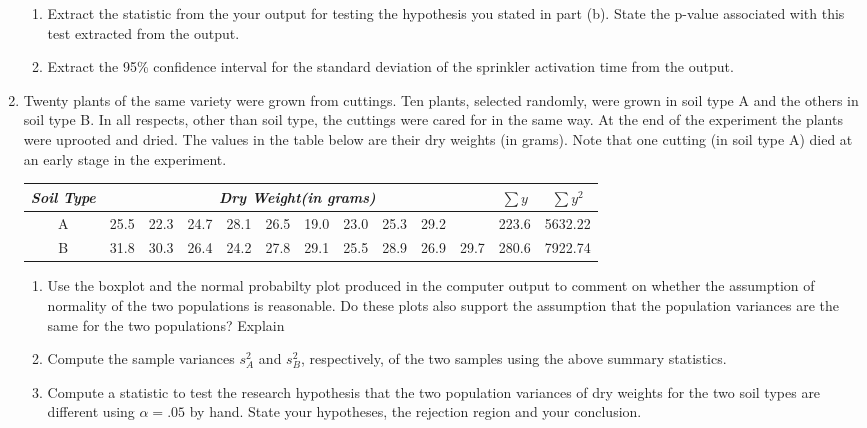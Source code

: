 \documentclass[11pt]{article}
\begin{document}
\begin{enumerate}
\begin{enumerate}
\item Extract the statistic from the your output for testing the
hypothesis you stated in part (b).
State the p-value associated with this test extracted from the  output.\\[1in]

\item  Extract the  95\% confidence interval for the standard deviation 
of the sprinkler activation time from the output. 
\end{enumerate}






\newpage
\item Twenty plants of the same variety were grown from cuttings. Ten plants, selected randomly,
were grown in soil type A and the others in soil type B. In all respects, other than
soil type, the cuttings were cared for in the same way. At the end of the experiment the
plants were uprooted and dried. The values in the table below are their dry weights (in grams).
Note that one cutting (in soil type A) died at an early stage in the experiment.
\begin{center}
\begin{tabular}{c|rrrrrrrrrr|rr}
\hline 
 \multicolumn{1}{c|}{\textit{Soil Type}} & \multicolumn{10}{c|}{\textit{Dry Weight(in grams)}} & 
     \multicolumn{1}{c}{$\sum{y}$} &
     \multicolumn{1}{c}{$\sum{y^2}$}  \\ \hline
A & 25.5 &  22.3 &  24.7 &  28.1 &  26.5 &  19.0 &  23.0 &  25.3 &  29.2 & &223.6  & 5632.22     \\
B & 31.8 &  30.3 &  26.4 &  24.2 &  27.8 &  29.1 &  25.5 &  28.9 &  26.9 &  29.7 & 280.6 & 7922.74 \\ \hline
\end{tabular}
\end{center}
\begin{enumerate}
\item Use the boxplot and the normal probabilty plot produced in the computer output
to comment on whether the assumption of normality of the two populations
is reasonable. Do these plots also support the assumption that
the population variances are the same for the two populations? 
Explain\\[1in]


\item Compute the sample variances $s_A^2$ and $s_B^2$, respectively, of the two samples using the above summary statistics.\\[.8in]
\item Compute a statistic to test the research hypothesis that the two 
population variances of dry weights for the two soil types are different using 
$\alpha=.05$ by hand. State your hypotheses, the rejection region and 
your conclusion.\\[1.8in]



\end{enumerate}
\end{enumerate}
\end{document}
